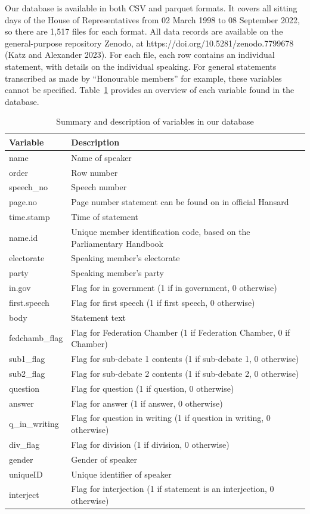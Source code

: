 \documentclass[
  letterpaper,
  DIV=11,
  numbers=noendperiod]{scrartcl}
\begin{document}
Our database is available in both CSV and parquet formats. It covers all
sitting days of the House of Representatives from 02 March 1998 to 08
September 2022, so there are 1,517 files for each format. All data
records are available on the general-purpose repository Zenodo, at
https://doi.org/10.5281/zenodo.7799678 (Katz and Alexander 2023). For
each file, each row contains an individual statement, with details on
the individual speaking. For general statements transcribed as made by
``Honourable members'' for example, these variables cannot be specified.
Table~\ref{tbl-vars} provides an overview of each variable found in the
database.

\hypertarget{tbl-vars}{}
\begin{table}[H]
\caption{\label{tbl-vars}Summary and description of variables in our database }\tabularnewline

\centering
\begin{tabular}{ll}
\toprule
Variable & Description\\
\midrule
name & Name of speaker\\
order & Row number\\
speech\_no & Speech number\\
page.no & Page number statement can be found on in official Hansard\\
time.stamp & Time of statement\\
\addlinespace
name.id & Unique member identification code, based on the Parliamentary Handbook\\
electorate & Speaking member's electorate\\
party & Speaking member's party\\
in.gov & Flag for in government (1 if in government, 0 otherwise)\\
first.speech & Flag for first speech (1 if first speech, 0 otherwise)\\
\addlinespace
body & Statement text\\
fedchamb\_flag & Flag for Federation Chamber (1 if Federation Chamber, 0 if Chamber)\\
sub1\_flag & Flag for sub-debate 1 contents (1 if sub-debate 1, 0 otherwise)\\
sub2\_flag & Flag for sub-debate 2 contents (1 if sub-debate 2, 0 otherwise)\\
question & Flag for question (1 if question, 0 otherwise)\\
\addlinespace
answer & Flag for answer (1 if answer, 0 otherwise)\\
q\_in\_writing & Flag for question in writing (1 if question in writing, 0 otherwise)\\
div\_flag & Flag for division (1 if division, 0 otherwise)\\
gender & Gender of speaker\\
uniqueID & Unique identifier of speaker\\
\addlinespace
interject & Flag for interjection (1 if statement is an interjection, 0 otherwise)\\
\bottomrule
\end{tabular}
\end{table}
\end{document}
